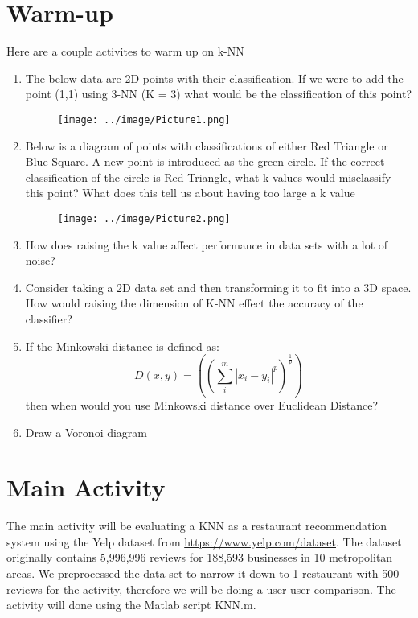 \documentclass{report}
\begin{document}
\section*{Warm-up}
Here are a couple activites to warm up on k-NN 
\begin{enumerate}
	\item The below data are 2D points with their classification. If we were to add the point (1,1) using 3-NN (K = 3) what would be the classification of this point?
	\begin{figure}[H]
		\centering
		\texttt{[image: ../image/Picture1.png]}
	\end{figure}
	\item Below is a diagram of points with classifications of either Red Triangle or Blue Square. A new point is introduced as the green circle. If the correct classification of the circle is Red Triangle, what k-values would misclassify this point? What does this tell us about having too large a k value
	\begin{figure}[H]
		\centering
		\texttt{[image: ../image/Picture2.png]}
	\end{figure}
	\item How does raising the k value affect performance in data sets with a lot of noise? 
	\item Consider taking a 2D data set and then transforming it to fit into a 3D space. How would raising the dimension of K-NN effect the accuracy of the classifier?
	\item If the Minkowski distance is defined as: 
	\begin{equation}
	D (x, y) = ((\sum_{i}^{m}| x_{i} - y_{i}|^p)^\frac{1}{p})
	\end{equation}
     then when would you use Minkowski distance over Euclidean Distance?
	

\item Draw a Voronoi diagram
\end{enumerate}

\section*{Main Activity}

The main activity will be evaluating a KNN as a restaurant recommendation system using the Yelp dataset from \href{https://www.yelp.com/dataset}{https://www.yelp.com/dataset}.
The dataset originally contains 5,996,996 reviews for 188,593 businesses in 10 metropolitan areas.
We preprocessed the data set to narrow it down to 1 restaurant with 500 reviews for the activity, therefore we will be doing a user-user comparison.  
The activity will done using the Matlab script KNN.m.
\end{document}
